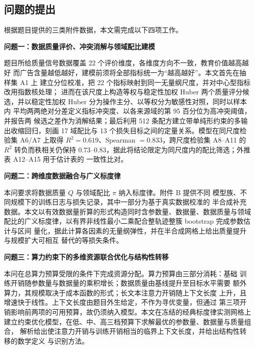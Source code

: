 \documentclass[bwprint]{gmcmthesis}
\numberwithin{equation}{section}
\numberwithin{figure}{section}
\numberwithin{table}{section}
\begin{document}
\subsection{问题的提出}


根据题目提供的三类附件数据，本文需完成以下四项工作。

\textbf{问题一：数据质量评价、冲突消解与领域配比建模}

题目所给质量信号数据覆盖 22 个评价维度，各维度方向不一致，教育价值越高越好
而广告含量越低越好，建模前须将全部指标统一为“越高越好”。本文首先在抽样集 A1 上
建立分位校准，把 22 个指标映射到同一无量纲尺度，并对中心型指标改用指数核处理；
进而在该尺度上构造等权与稳定性加权 Huber 两个质量评分候选，并以稳定性加权 Huber
分为操作主分、以等权分为敏感性对照，同时以样本内
平均两两绝对分差定义指标冲突度、以各来源域的第 95 百分位为高冲突阈值，并报告两
候选之差作为消解结果；最后利用 512 条配方建立带单纯形约束的多输出收缩回归，刻画
17 域配比与 13 个损失目标之间的定量关系。模型在同尺度检验集 A6/A7 上取得
$R^2=0.619$、Spearman $=0.833$，跨尺度检验集 A8--A11 的 $R^2$ 转负而秩相关仍保持
$0.73$--$0.83$，据此将结论限定为同尺度内的配比筛选；外推表 A12--A15 用于估计表的
一致性比对。

\textbf{问题二：跨维度数据融合与广义标度律}

本问要求将数据质量 $Q$ 与领域配比 $\pi$ 纳入标度律。附件 B 提供不同
模型族、不同规模下的训练日志与损失记录，其中一部分为基于真实数据校准的
半合成补充数据。本文以有效数据量折算的形式构造同时含参数量、数据量、数据质量与领域
配比的广义标度律，以有界非线性最小二乘配合整轨迹整簇 bootstrap 完成参数估计与区间
量化，据此计算各因素的无量纲弹性，并在半合成网格上给出质量提升与规模扩大可相互
替代的等损失条件。

\textbf{问题三：算力约束下的多维资源联合优化与结构性转移}

本问在总算力预算受限的条件下完成资源分配。算力预算由三部分消耗：基础
训练开销随参数量与数据量的乘积增长；数据质量由基线提升至目标水平需要
额外算力，其规模取决于成本函数的形式；长文本注意力开销随上下文长度
上升，且增速快于线性。上下文长度由题目外生给定，不作为寻优变量，但通过
第三项开销影响前两项的可用预算，故仍须纳入模型。本文在冻结的经典标度律实测网格上
建立约束优化模型，在低、中、高三档预算下求解最优的参数量、数据量与质量组合，
解析给出使注意力开销与训练开销相当的临界上下文长度，并给出结构性转移的数学定义
与识别方法。
\end{document}
